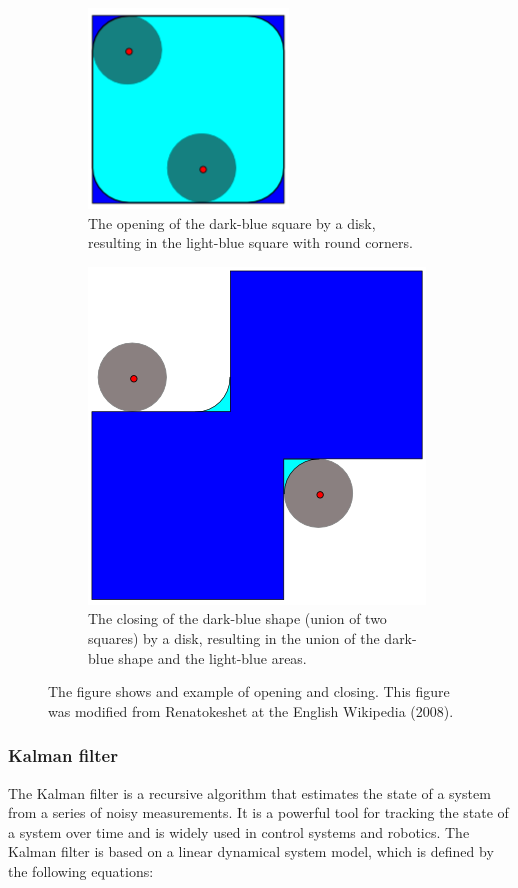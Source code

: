 \begin{figure}[h]
    \centering
    \begin{subfigure}[t]{0.45\textwidth}
        \centering
        \includegraphics[width=0.5\linewidth]{figures/detection/opening.png}
        \caption{The opening of the dark-blue square by a disk, resulting in the light-blue square with round corners.}
        \label{fig:opening}
    \end{subfigure}
    \begin{subfigure}[t]{0.45\textwidth}
        \centering
        \includegraphics[width=0.5\linewidth]{figures/detection/closing.png}
        \caption{The closing of the dark-blue shape (union of two squares) by a disk, resulting in the union of the dark-blue shape and the light-blue areas.}
        \label{fig:closing}
    \end{subfigure}
    \caption{The figure shows and example of opening and closing. This figure was modified from Renatokeshet at the English Wikipedia (2008).}
    \label{fig:opening_and_closing}
\end{figure}

\subsubsection{Kalman filter} \label{subsubsec:kalman_filter}
The Kalman filter is a recursive algorithm that estimates the state of a system from a series of noisy measurements. It is a powerful tool for tracking the state of a system over time and is widely used in control systems and robotics. The Kalman filter is based on a linear dynamical system model, which is defined by the following equations:

